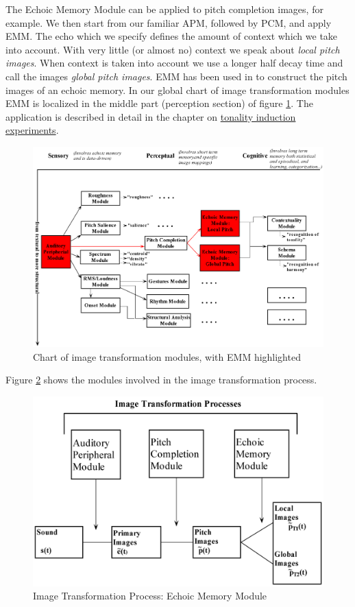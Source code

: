 The Echoic Memory Module can be applied to pitch completion
images, for example. We then start from our familiar APM, followed
by PCM, and apply EMM. The echo which we specify defines the
amount of context which we take into account. With very little (or
almost no) context we speak about \emph{local pitch images}. When
context is taken into account we use a longer half decay time and
call the images \emph{global pitch images}. EMM has been used in
 to construct the
pitch images of an echoic memory. In our global chart of image
transformation modules EMM is localized in the middle part
(perception section) of figure \ref{Fig:ModulesEMM}. The
application is described in detail in the chapter on
\hyperlink{Concepts:IPEMGenerateProbes}{{tonality induction
experiments}}.
\begin{figure}[h]
    \centering
    \includegraphics[width=\textwidth]{Graphics/ModulesEMM}
    \caption{Chart of image transformation modules, with EMM highlighted}
    \label{Fig:ModulesEMM}
\end{figure}
Figure \ref {Fig:EMMModule} shows the modules involved in the
image transformation process.
\begin{figure}[h]
    \centering
    \includegraphics[width=\IPEMDefaultFigureWidth]{Graphics/EMMModule}
    \caption{Image Transformation Process: Echoic Memory Module}
    \label{Fig:EMMModule}
\end{figure}

